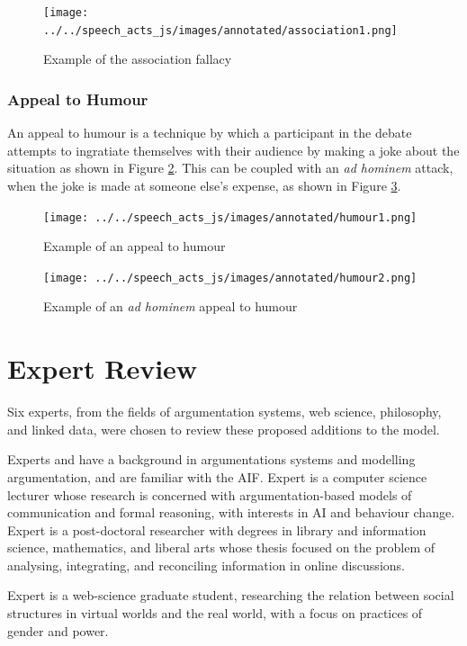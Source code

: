 \begin{figure}[H]
\centering
\texttt{[image: ../../speech\_acts\_js/images/annotated/association1.png]}
\caption{Example of the association fallacy}
\label{figure:association1}
\end{figure}

\subsubsection{Appeal to Humour}
An appeal to humour is a technique by which a participant in the debate attempts to ingratiate themselves with their audience by making a joke about the situation as shown in Figure \ref{figure:humour1}. This can be coupled with an \textit{ad hominem} attack, when the joke is made at someone else's expense, as shown in Figure \ref{figure:humour2}.
\begin{figure}[H]
\centering
\texttt{[image: ../../speech\_acts\_js/images/annotated/humour1.png]}
\caption{Example of an appeal to humour}
\label{figure:humour1}
\end{figure}

\begin{figure}[H]
\centering
\texttt{[image: ../../speech\_acts\_js/images/annotated/humour2.png]}
\caption{Example of an \textit{ad hominem} appeal to humour}
\label{figure:humour2}
\end{figure}

\section{Expert Review}
Six experts, from the fields of argumentation systems,  web science, philosophy, and linked data, were chosen to review these proposed additions to the model.

Experts \simon and \jodi have a background in argumentations systems and modelling argumentation, and are familiar with the AIF. Expert \simon is a computer science lecturer whose research is concerned with argumentation-based models of communication and formal reasoning, with interests in AI and behaviour change. Expert \jodi is a post-doctoral researcher with degrees in library and information science, mathematics, and liberal arts whose thesis focused on the problem of analysing, integrating, and reconciling information in online discussions.

Expert \bob is a web-science graduate student, researching the relation between social structures in virtual worlds and the real world, with a focus on practices of gender and power.

